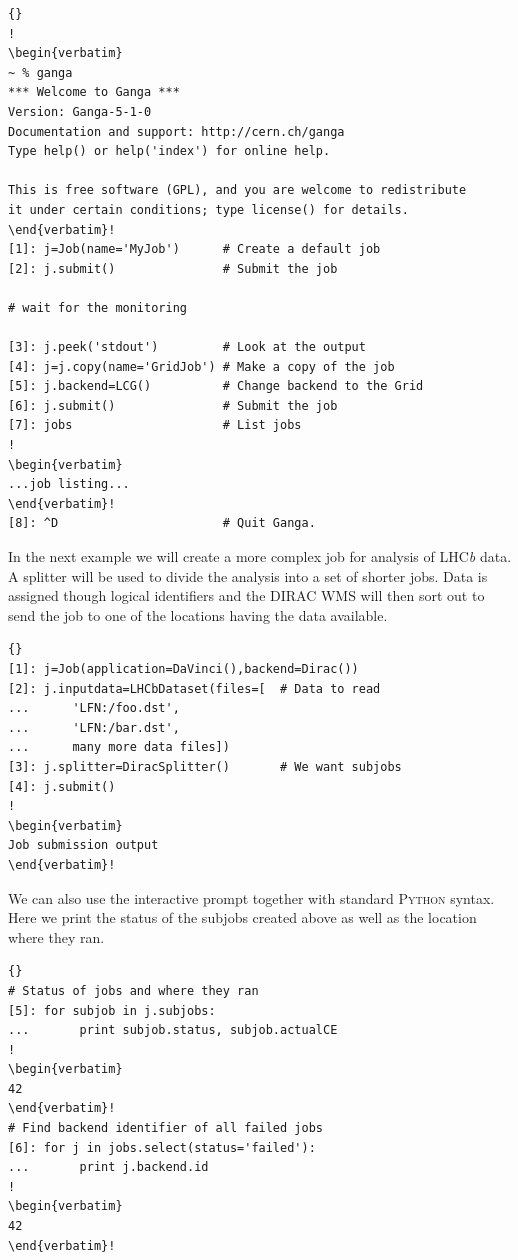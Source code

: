 \documentclass{elsart}
\def\lhcb {LHC{\em b\/}\xspace}
\def\dirac{DIRAC\xspace}
\def\python {\textsc{Python}\xspace}
\begin{document}
\tiny
\lstset{language=Python} \lstset{commentstyle=\textit}
\lstset{backgroundcolor=,rulecolor=}
\begin{lstlisting}[escapechar=!]{}
!
\begin{verbatim}
~ % ganga
*** Welcome to Ganga ***
Version: Ganga-5-1-0
Documentation and support: http://cern.ch/ganga
Type help() or help('index') for online help.

This is free software (GPL), and you are welcome to redistribute
it under certain conditions; type license() for details.
\end{verbatim}!
[1]: j=Job(name='MyJob')      # Create a default job
[2]: j.submit()               # Submit the job

# wait for the monitoring

[3]: j.peek('stdout')         # Look at the output
[4]: j=j.copy(name='GridJob') # Make a copy of the job
[5]: j.backend=LCG()          # Change backend to the Grid
[6]: j.submit()               # Submit the job
[7]: jobs                     # List jobs
!
\begin{verbatim}
...job listing...
\end{verbatim}!
[8]: ^D                       # Quit Ganga.
\end{lstlisting}
\normalsize

\vspace{-2ex}
In the next example we will create a more complex job for analysis of \lhcb
data. A splitter will be used to divide the analysis into a set of shorter
jobs. Data is assigned though logical identifiers and the \dirac WMS will then
sort out to send the job to one of the locations having the data available.
\tiny
\begin{lstlisting}[escapechar=!]{}
[1]: j=Job(application=DaVinci(),backend=Dirac())
[2]: j.inputdata=LHCbDataset(files=[  # Data to read
...      'LFN:/foo.dst',
...      'LFN:/bar.dst',
...      many more data files])
[3]: j.splitter=DiracSplitter()       # We want subjobs
[4]: j.submit()
!
\begin{verbatim}
Job submission output
\end{verbatim}!
\end{lstlisting}
\normalsize

\vspace{-2ex}
We can also use the interactive prompt together with standard \python syntax.
Here we print the status of the subjobs created above as well as the location
where they ran.
\tiny
\begin{lstlisting}[escapechar=!]{}
# Status of jobs and where they ran
[5]: for subjob in j.subjobs: 
...       print subjob.status, subjob.actualCE
!
\begin{verbatim}
42
\end{verbatim}!
# Find backend identifier of all failed jobs
[6]: for j in jobs.select(status='failed'):
...       print j.backend.id
!
\begin{verbatim}
42
\end{verbatim}!
\end{lstlisting}
\normalsize
\end{document}
